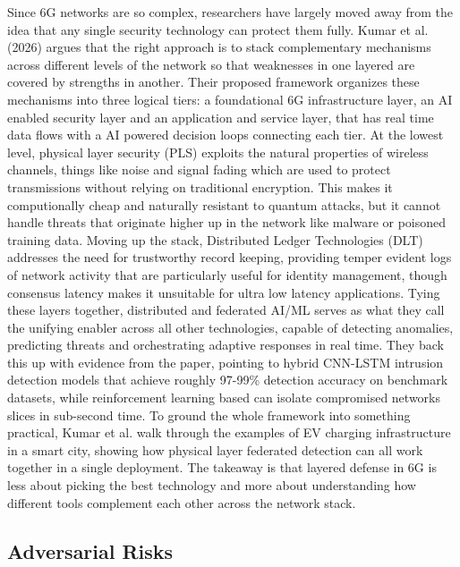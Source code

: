 \documentclass[letterpaper]{article} %
\begin{document}
Since 6G networks are so complex, researchers have largely moved away from the idea that any single security technology can protect them fully. Kumar et al. (2026) argues that the right approach is to stack complementary mechanisms across different levels of the network so that weaknesses in one layered are covered by strengths in another. Their proposed framework organizes these mechanisms into three logical tiers: a foundational 6G infrastructure layer, an AI enabled security layer and an application and service layer, that has real time data flows with a AI powered decision loops connecting each tier. At the lowest level, physical layer security (PLS) exploits the natural properties of wireless channels, things like noise and signal fading which are used to protect transmissions without relying on traditional encryption. This makes it computionally cheap and naturally resistant to quantum attacks, but it cannot handle threats that originate higher up in the network like malware or poisoned training data. Moving up the stack, Distributed Ledger Technologies (DLT) addresses the need for trustworthy record keeping, providing temper evident logs of network activity that are particularly useful for identity management, though consensus latency makes it unsuitable for ultra low latency applications. Tying these layers together, distributed and federated AI/ML serves as what they call the unifying enabler across all other technologies, capable of detecting anomalies, predicting threats and orchestrating adaptive responses in real time. They back this up with evidence from the paper, pointing to hybrid CNN-LSTM intrusion detection models that achieve roughly 97-99\% detection accuracy on benchmark datasets, while reinforcement learning based can isolate compromised networks slices in sub-second time. To ground the whole framework into something practical, Kumar et al. walk through the examples of EV charging infrastructure in a smart city, showing how physical layer federated detection can all work together in a single deployment. The takeaway is that layered defense in 6G is less about picking the best technology and more about understanding how different tools complement each other across the network stack.


\subsection{Adversarial Risks}
\end{document}
